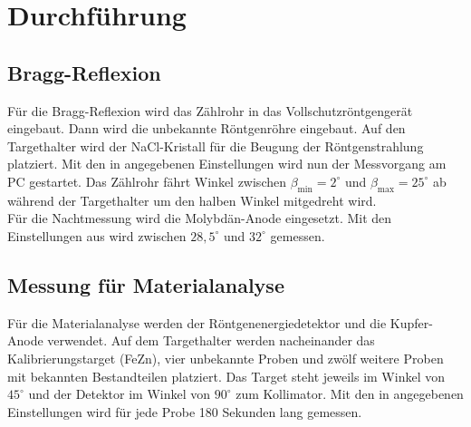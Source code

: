 \section{Durchführung}

\subsection{Bragg-Reflexion}
Für die Bragg-Reflexion wird das Zählrohr in das Vollschutzröntgengerät eingebaut. Dann wird die unbekannte Röntgenröhre eingebaut. Auf den Targethalter wird der NaCl-Kristall für die Beugung der Röntgenstrahlung platziert. Mit den in \cite{praktikumsheft} angegebenen Einstellungen wird nun der Messvorgang am PC gestartet. Das Zählrohr fährt Winkel zwischen $\beta_\mathrm{min}=2^\circ$ und $\beta_\mathrm{max}=25^\circ$ ab während der Targethalter um den halben Winkel mitgedreht wird. \\
Für die Nachtmessung wird die Molybdän-Anode eingesetzt. Mit den Einstellungen aus \cite{praktikumsheft} wird zwischen $28,5^\circ$ und $32^\circ$ gemessen.

\subsection{Messung für Materialanalyse}
Für die Materialanalyse werden der Röntgenenergiedetektor und die Kupfer-Anode verwendet. Auf dem Targethalter werden nacheinander das Kalibrierungstarget (FeZn), vier unbekannte Proben und zwölf weitere Proben mit bekannten Bestandteilen platziert. Das Target steht jeweils im Winkel von $45^\circ$ und der Detektor im Winkel von $90^\circ$ zum Kollimator. Mit den in \cite{praktikumsheft} angegebenen Einstellungen wird für jede Probe 180 Sekunden lang gemessen. 
